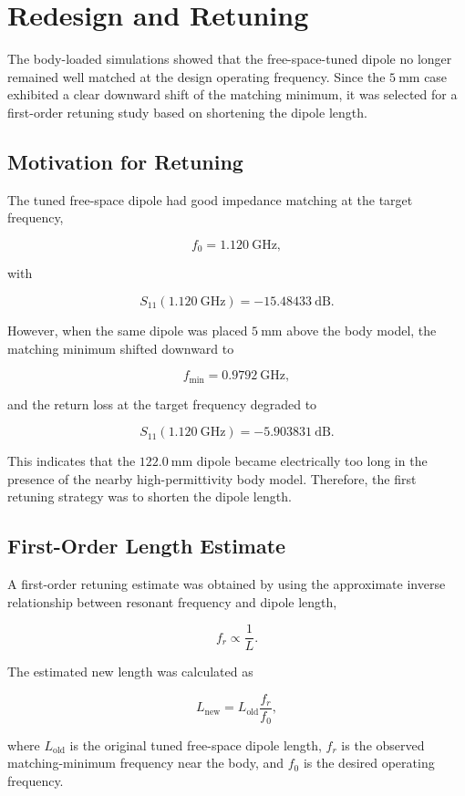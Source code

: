 \section{Redesign and Retuning}

The body-loaded simulations showed that the free-space-tuned dipole no longer remained well matched at the design operating frequency. Since the \(5~\mathrm{mm}\) case exhibited a clear downward shift of the matching minimum, it was selected for a first-order retuning study based on shortening the dipole length.

\subsection{Motivation for Retuning}

The tuned free-space dipole had good impedance matching at the target frequency,

\[
f_0 = 1.120~\mathrm{GHz},
\]

with

\[
S_{11}(1.120~\mathrm{GHz}) = -15.48433~\mathrm{dB}.
\]

However, when the same dipole was placed \(5~\mathrm{mm}\) above the body model, the matching minimum shifted downward to

\[
f_{\min} = 0.9792~\mathrm{GHz},
\]

and the return loss at the target frequency degraded to

\[
S_{11}(1.120~\mathrm{GHz}) = -5.903831~\mathrm{dB}.
\]

This indicates that the \(122.0~\mathrm{mm}\) dipole became electrically too long in the presence of the nearby high-permittivity body model. Therefore, the first retuning strategy was to shorten the dipole length.

\subsection{First-Order Length Estimate}

A first-order retuning estimate was obtained by using the approximate inverse relationship between resonant frequency and dipole length,

\[
f_r \propto \frac{1}{L}.
\]

The estimated new length was calculated as

\[
L_{\mathrm{new}}
=
L_{\mathrm{old}}
\frac{f_r}{f_0},
\]

where \(L_{\mathrm{old}}\) is the original tuned free-space dipole length, \(f_r\) is the observed matching-minimum frequency near the body, and \(f_0\) is the desired operating frequency.


